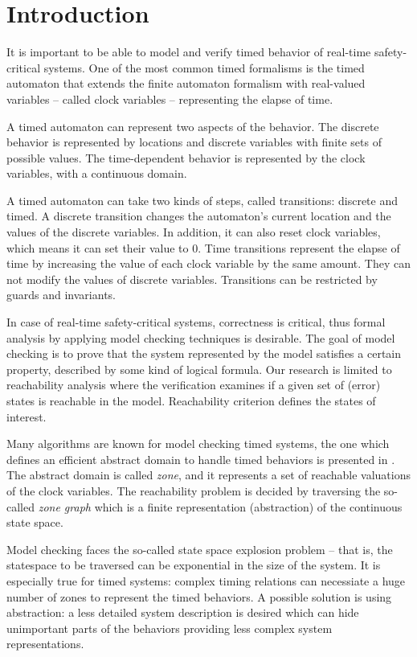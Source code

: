 \chapter{Introduction}
\label{chap:introduction}
It is important to be able to model and verify timed behavior of
real-time safety-critical systems. One of the most common timed formalisms is 
the timed automaton that extends the finite automaton formalism
with real-valued variables -- called clock variables -- representing the elapse
of time.

A timed automaton can represent two aspects of the behavior. The discrete behavior
is represented by locations and discrete variables with finite sets of possible
values. The time-dependent behavior is represented by the clock variables, with
a continuous domain.

A timed automaton can take two kinds of steps, called transitions: discrete and timed.
A discrete transition changes the automaton's current location and the values of the discrete variables. In addition, it can also reset clock variables, which means it can set their value to 0.
Time transitions represent the elapse of time by increasing the value of each clock variable by the same amount. They can not modify the values of discrete variables. Transitions can be restricted by guards and invariants.

In case of real-time safety-critical systems, correctness is critical, thus
formal  analysis by applying model checking techniques is desirable.
The goal of model checking is to prove that the system represented by the
model satisfies a certain property, described by some kind of
logical formula. 
Our research is limited to reachability analysis where the verification examines if a given set of (error) states is reachable in the model. Reachability criterion defines the states of interest.

Many algorithms are known for model checking timed systems, the one which
defines an efficient abstract domain to handle timed behaviors is presented in
. The abstract domain is called \emph{zone}, and it represents a set of reachable valuations of the clock
variables. The reachability problem is decided by traversing the so-called \emph{zone graph}
which is a finite representation (abstraction) of the continuous
state space.

Model checking faces the so-called state space explosion problem --
that is, the statespace to be traversed can be exponential in the size of the system.
It is especially true for timed systems: complex timing relations can necessiate a huge number of zones to represent the timed behaviors.
A possible solution is using abstraction: a less detailed system description is desired which can
hide unimportant parts of the behaviors providing less complex system
representations.

